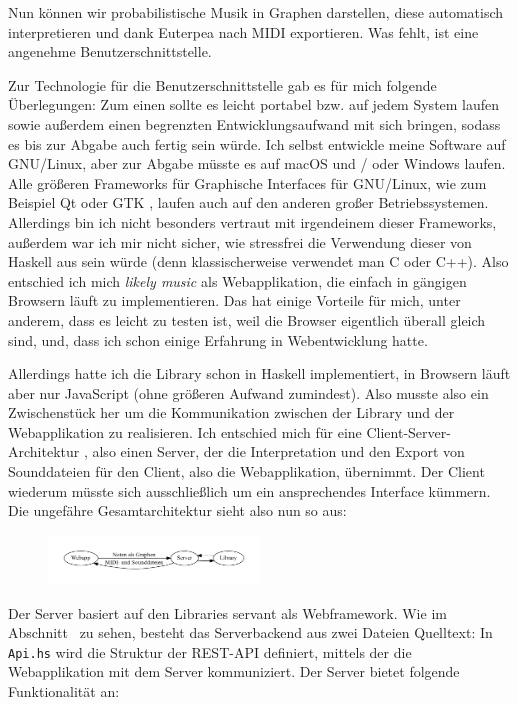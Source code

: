 \documentclass[a4paper,twocolumn]{article}
\begin{document}
Nun können wir probabilistische Musik in Graphen darstellen, diese automatisch
interpretieren und dank Euterpea nach MIDI exportieren. Was fehlt, ist eine
angenehme Benutzerschnittstelle.

Zur Technologie für die Benutzerschnittstelle gab es für mich folgende
Überlegungen: Zum einen sollte es leicht portabel bzw. auf jedem System laufen
sowie außerdem einen begrenzten Entwicklungsaufwand mit sich bringen, sodass es
bis zur Abgabe auch fertig sein würde. Ich selbst entwickle meine Software auf
GNU/Linux, aber zur Abgabe müsste es auf macOS und / oder Windows laufen. Alle
größeren Frameworks für Graphische Interfaces für GNU/Linux, wie zum Beispiel Qt
\cite{qt} oder GTK \cite{gtk}, laufen auch auf den anderen großer
Betriebssystemen. Allerdings bin ich nicht besonders vertraut mit irgendeinem
dieser Frameworks, außerdem war ich mir nicht sicher, wie stressfrei die
Verwendung dieser von Haskell aus sein würde (denn klassischerweise verwendet
man C oder C++). Also entschied ich mich {\it likely music} als Webapplikation,
die einfach in gängigen Browsern läuft zu implementieren. Das hat einige
Vorteile für mich, unter anderem, dass es leicht zu testen ist, weil die Browser
eigentlich überall gleich sind, und, dass ich schon einige Erfahrung in
Webentwicklung hatte.

Allerdings hatte ich die Library schon in Haskell implementiert, in Browsern
läuft aber nur JavaScript (ohne größeren Aufwand zumindest). Also musste also
ein Zwischenstück her um die Kommunikation zwischen der Library und der
Webapplikation zu realisieren. Ich entschied mich für eine
Client-Server-Architektur \cite{wikipedia_client_server}, also einen Server, der
die Interpretation und den Export von Sounddateien für den Client, also die
Webapplikation, übernimmt. Der Client wiederum müsste sich ausschließlich um ein
ansprechendes Interface kümmern. Die ungefähre Gesamtarchitektur sieht also nun
so aus:

\begin{figure}[h]
  \includegraphics[width=0.5\textwidth]{architektur}
\end{figure}

Der Server basiert auf den Libraries servant \cite{servant} als Webframework.
Wie im Abschnitt~ zu sehen, besteht das Serverbackend aus
zwei Dateien Quelltext: In \lstinline[basicstyle=\ttfamily]|Api.hs| wird die
Struktur der REST-API \cite{wikipedia_rest} definiert, mittels der die
Webapplikation mit dem Server kommuniziert. Der Server bietet folgende Funktionalität
an:
\end{document}
